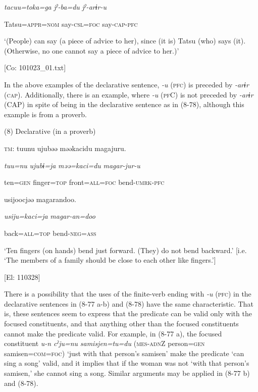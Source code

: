       \textit{tacuu=toka=ga}  \textit{jˀ-ba=du}  \textit{jˀ-arɨr-u}

      Tatsu=\textsc{appr}=\textsc{nom}  say-\textsc{csl}=\textsc{foc}  say-\textsc{cap}-\textsc{pfc}

      ‘(People) can say (a piece of advice to her), since (it is) Tatsu (who) says (it). (Otherwise, no one cannot say a piece of advice to her.)’

      [Co: 101023\_01.txt]

In the above examples of the declarative sentence, \textit{{}-u} (\textsc{pfc}) is preceded by \textit{-arɨr} (\textsc{cap}). Additionally, there is an example, where \textit{-u} (\textsc{pf}C) is not preceded by \textit{{}-arɨr} (CAP) in spite of being in the declarative sentence as in (8-78), although this example is from a proverb.

(8)  Declarative (in a proverb)

  \textsc{tm}:  tuunu  ujubəə  məəkacidu  magajuru.

    \textit{tuu=nu}  \textit{ujubɨ=ja}  \textit{məə=kaci=du}  \textit{magar-jur-u}

    ten=\textsc{gen}  finger=\textsc{top}  front=\textsc{all}=\textsc{foc}  bend-\textsc{umrk}-\textsc{pfc}

    usijoocjəə  magarandoo.

    \textit{usiju=kaci=ja}  \textit{magar-an=doo}

    back=\textsc{all}=\textsc{top}  bend-\textsc{neg}=\textsc{ass}

    ‘Ten fingers (on hands) bend just forward. (They) do not bend backward.’ [i.e. ‘The members of a family should be close to each other like fingers.’]

    [El: 110328]

There is a possibility that the uses of the finite-verb ending with \textit{{}-u} (\textsc{pfc}) in the declarative sentences in (8-77 a-b) and (8-78) have the same characteristic. That is, these sentences seem to express that the predicate can be valid only with the focused constituents, and that anything other than the focused constituents cannot make the predicate valid. For example, in (8-77 a), the focused constituent \textit{u-n} \textit{cˀju=nu} \textit{samisjen=tu=du} (\textsc{mes}-\textsc{adn}Z person=\textsc{gen} samisen=\textsc{com}=\textsc{foc}) ‘just with that person’s samisen’ make the predicate ‘can sing a song’ valid, and it implies that if the woman was not ‘with that person’s samisen,’ she cannot sing a song. Similar arguments may be applied in (8-77 b) and (8-78).

